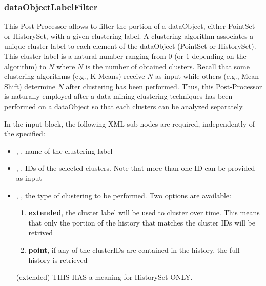 \subsubsection{dataObjectLabelFilter}
\label{dataObjectLabelFilter}

This Post-Processor allows to filter the portion of a dataObject, either PointSet or HistorySet, with a given clustering label.
A clustering algorithm associates a unique cluster label to each element of the dataObject (PointSet or HistorySet).
This cluster label is a natural number ranging from $0$ (or $1$ depending on the algorithm) to $N$ where $N$ is the number of obtained clusters.
Recall that some clustering algorithms (e.g., K-Means) receive $N$ as input while others (e.g., Mean-Shift) determine $N$ after clustering has been performed.
Thus, this Post-Processor is naturally employed after a data-mining clustering techniques has been performed on a dataObject so that each clusters
can be analyzed separately.


In the  input block, the following XML sub-nodes are required,
independently of the  specified:

\begin{itemize}
   \item {}, , name of the clustering label
   \item {}, , IDs of the selected clusters.
   Note that more than one ID can be provided as input
   \item {}, , the type of clustering to be
     performed.  Two options are available:
     \begin{enumerate}
       \item \textbf{extended}, the cluster label will be used to cluster over time. This means that
        only the portion of the history that matches the cluster IDs will be retrived
       \item \textbf{point}, if any of the clusterIDs are contained in the history, the full history is
       retrieved
     \end{enumerate}
      (extended)
     \nb THIS HAS a meaning for HistorySet ONLY.
\end{itemize}
